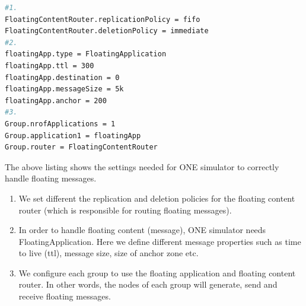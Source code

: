 \begin{lstlisting}[language=bash]
#1.
FloatingContentRouter.replicationPolicy = fifo
FloatingContentRouter.deletionPolicy = immediate
#2.
floatingApp.type = FloatingApplication
floatingApp.ttl = 300
floatingApp.destination = 0
floatingApp.messageSize = 5k
floatingApp.anchor = 200
#3.
Group.nrofApplications = 1
Group.application1 = floatingApp
Group.router = FloatingContentRouter

\end{lstlisting}
\vspace{3mm}
The above listing shows the settings needed for ONE simulator to correctly handle floating messages.
\begin{enumerate}
  \item We set different the replication and deletion policies for the floating content router (which is responsible for routing floating messages).
  \item In order to handle floating content (message), ONE simulator needs FloatingApplication.  Here we define different message properties such as time to live (ttl), message size, size of anchor zone etc.
  \item We configure each group to use the floating application and floating content router. In other words, the nodes of each group will generate, send and receive floating messages.
\end{enumerate}
